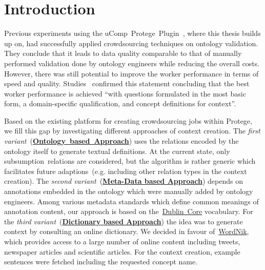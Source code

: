\section{Introduction}\label{sec:approaches_introduction}
Previous experiments using the uComp~Protege~Plugin~\cite{wohlgenannt2016}, where this thesis builds up on, had successfully applied crowdsourcing techniques on ontology validation. They conclude that it leads to data quality comparable to that of manually performed validation done by ontology engineers while reducing the overall costs. However, there was still potential to improve the worker performance in terms of speed and quality. 
Studies~\cite{mortensen2013} confirmed this statement concluding that the best worker performance is achieved
\enquote{with questions formulated in the most basic form, a domain-specific qualification, and concept definitions for context}.

Based on the existing platform for creating crowdsourcing jobs within Protege, we fill this gap by investigating different approaches of context creation.
The \emph{first variant}~(\hyperref[sec:enrichment_ontology_approach]{\textbf{Ontology~based~Approach}}) uses the relations encoded by the ontology itself to generate textual definitions. At the current state, only subsumption~relations are considered, but the algorithm is rather generic which facilitates future adaptions~(e.g. including other relation types in the context creation).
The \emph{second variant}~(\hyperref[sec:enrichment_metaData_approach]{\textbf{Meta-Data based Approach}}) depends on annotations embedded in the ontology which were manually added by ontology engineers. Among various metadata standards which define common meanings of annotation content, our approach is based on the~\hyperref[sec:dublin_core_metadata_vocabulary]{Dublin~Core} vocabulary.
For the \emph{third variant}~(\hyperref[sec:enrichment_dictionary_approach]{\textbf{Dictionary based Approach}}) the idea was to generate context by consulting an online dictionary. We decided in favour of~\hyperref[sec:wordnik]{WordNik}, which provides access to a large number of online content including tweets, newspaper articles and scientific articles. For the context creation, example sentences were fetched including the requested concept name. 